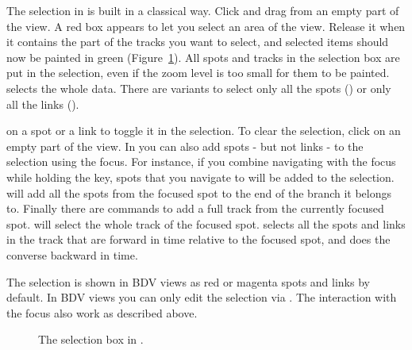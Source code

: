 The selection in \TrackScheme is built in a classical way. 
Click and drag from an empty part of the view.
A red box appears to let you select an area of the view.
Release it when it contains the part of the tracks you want to select, and selected items should now be painted in green (Figure~\ref{fig:SelectionBox}).
All spots and tracks in the selection box are put in the selection, even if the zoom level is too small for them to be painted.
 selects the whole data. 
There are variants to select only all the spots () or only all the links ().

 on a spot or a link to toggle it in the selection.
To clear the selection, click on an empty part of the \TrackScheme view.
In \TrackScheme you can also add spots - but not links - to the selection using the focus.
For instance, if you combine navigating with the focus while holding the \keys{\shift} key, spots that you navigate to will be added to the selection. 
\keys{\shift+\Alt+\arrowkeydown} will add all the spots from the focused spot to the end of the branch it belongs to.
Finally there are commands to add a full track from the currently focused spot. 
 will select the whole track of the focused spot.
 selects all the spots and links in the track that are forward in time relative to the focused spot, and  does the converse backward in time.

The selection is shown in BDV views as red or magenta spots and links by default.
In BDV views you can only edit the selection via .
The interaction with the focus also work as described above.


\begin{figure}
    \centering
    \null\hfill
    \hfill
    \hfill\null
    
    \caption{The selection box in \TrackScheme.}
    \label{fig:SelectionBox}
\end{figure}  



